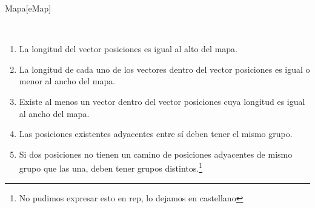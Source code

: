 \begin{Representacion}

	\begin{Estructura}{Mapa}[eMap]
		\begin{Tupla}[eMap]
		\end{Tupla}

		~

		\begin{Tupla}[dataPos]
		\end{Tupla}
	\end{Estructura}

	\begin{enumerate}
	
		\item La longitud del vector posiciones es igual al alto del mapa.
		
		\item La longitud de cada uno de los vectores dentro del vector posiciones es igual o menor al ancho del mapa.

		\item Existe al menos un vector dentro del vector posiciones cuya longitud es igual al ancho del mapa.

		\item Las posiciones existentes adyacentes entre sí deben tener el mismo grupo.
		
		\item Si dos posiciones no tienen un camino de posiciones adyacentes de mismo grupo que las una, deben tener grupos distintos.\footnote{No pudimos expresar esto en rep, lo dejamos en castellano}
 		
	\end{enumerate}


\end{Representacion}
